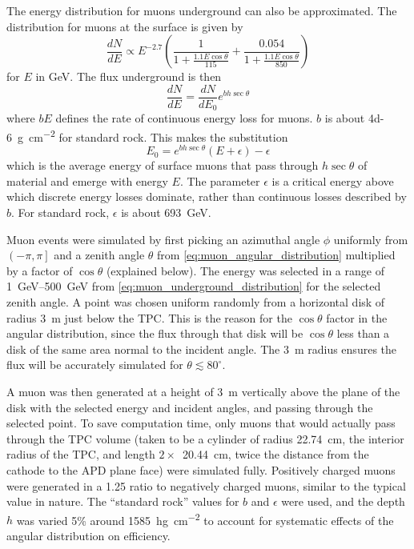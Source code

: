 \documentclass[herrin-thesis.tex]{subfiles}
\begin{document}
The energy distribution for muons underground can also be approximated\cite{Gaisser:1990kx}. The distribution for muons at the surface is given by
\begin{equation}
\label{eq:muon_surface_distribution}
\frac{dN}{dE} \propto E^{-2.7}\left(\frac{1}{1+\frac{1.1 E \cos \theta}{115}} + \frac{0.054}{1+\frac{1.1 E \cos \theta}{850}}\right)
\end{equation}
for \(E\) in \si{\GeV}. The flux underground is then
\begin{equation}
\label{eq:muon_underground_distribution}
\frac{dN}{dE} = \frac{dN}{dE_0}e^{b h \sec \theta}
\end{equation}
where \(b E\) defines the rate of continuous energy loss for muons. \(b\) is about \SI{4d-6}{\g\per\square\cm} for standard rock. This makes the substitution
\begin{equation}
\label{eq:muon_E0_def}
E_0 = e^{b h \sec \theta}\left(E + \epsilon\right) - \epsilon
\end{equation}
which is the average energy of surface muons that pass through \(h\sec\theta\) of material and emerge with energy \(E\). The parameter \(\epsilon\) is a critical energy above which discrete energy losses dominate, rather than continuous losses described by \(b\). For standard rock, \(\epsilon\) is about \SI{693}{\GeV}\cite{groom:2001ys}.

Muon events were simulated by first picking an azimuthal angle \(\phi\) uniformly from \(\left(-\pi, \pi\right]\) and a zenith angle \(\theta\) from \cref{eq:muon_angular_distribution} multiplied by a factor of \(\cos\theta\) (explained below). The energy was selected in a range of \SIrange{1}{500}{\GeV} from \cref{eq:muon_underground_distribution} for the selected zenith angle. A point was chosen uniform randomly from a horizontal disk of radius \SI{3}{\m} just below the TPC. This is the reason for the \(\cos\theta\) factor in the angular distribution, since the flux through that disk will be \(\cos\theta\) less than a disk of the same area normal to the incident angle. The \SI{3}{\m} radius ensures the flux will be accurately simulated for \(\theta \lesssim 80^{\circ}\).

A muon was then generated at a height of \SI{3}{\meter} vertically above the plane of the disk with the selected energy and incident angles, and passing through the selected point. To save computation time, only muons that would actually pass through the TPC volume (taken to be a cylinder of radius  \SI{22.74}{\cm}, the interior radius of the TPC, and length \(2\times\)~\SI{20.44}{\cm}, twice the distance from the cathode to the APD plane face) were simulated fully. Positively charged muons were generated in a 1.25 ratio to negatively charged muons, similar to the typical value in nature. The ``standard rock'' values for \(b\) and \(\epsilon\) were used, and the depth \(h\) was varied 5\% around \SI{1585}{\hecto\g\per\square\cm} to account for systematic effects of the angular distribution on efficiency.
\end{document}
